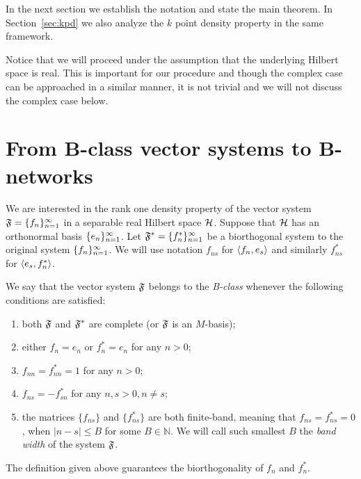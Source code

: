 \documentclass[12pt,oneside,a4paper]{amsart}
\begin{document}
  In the next section we establish the notation and state the main theorem.
  In Section~\ref{sec:kpd} we also analyze the $k$ point density property in the same framework.

  Notice that we will proceed under the assumption that the underlying Hilbert space is real.
  This is important for our procedure and though the complex case can be approached in
    a similar manner, it is not trivial and we will not discuss the complex case below.
\bigskip
\section{From B-class vector systems to B-networks}
    \label{fsys2graphs}
    We are interested in the rank one density property of the vector system $\fsys = \seq{f}$
      in a separable real Hilbert space $\cal{H}$.
    Suppose that $\cal{H}$ has an orthonormal basis $\seq{e}$.
    Let $\fstarsys = \{f_n^{*}\}_{n=1}^\infty$ be a biorthogonal system to the original system $\seq{f}$.
    We will use notation $f_{ns}$ for $\inner{f_n}{e_s}$ and similarly $f^*_{ns}$ for $\inner{e_s}{f^*_n}$.
    \begin{definition}
      We say that the vector system $\fsys$ belongs to the \emph{B-class} whenever the following conditions are satisfied:
      \begin{enumerate}[label=\textbf{C\arabic*}]
        \item \label{c1} both $\fsys$ and $\fstarsys$ are complete (or $\fsys$ is an $M$-basis);
        \item \label{c2} either $f_n = e_n$ or $f^*_n = e_n$ for any $n > 0$;
        \item \label{c3} $f_{nn} = f^*_{nn} = 1$ for any $n > 0$;
        \item \label{c4} $f_{ns} = -f^*_{sn}$ for any $n, s > 0, n \neq s$;
        \item \label{c5} the matrices $\{f_{ns}\}$ and $\{f^*_{ns}\}$ are both finite-band,
            meaning that $f_{ns} = f^*_{ns} = 0$, when $\lvert n - s \rvert \leq B$ for some $B \in \mathbb{N}$.
          We will call such smallest $B$ the \emph{band width} of the system $\fsys$.
      \end{enumerate}
    \end{definition}
    \begin{prop}
      The definition given above guarantees the biorthogonality of $f_n$ and $f^*_n$.
    \end{prop}
\end{document}
